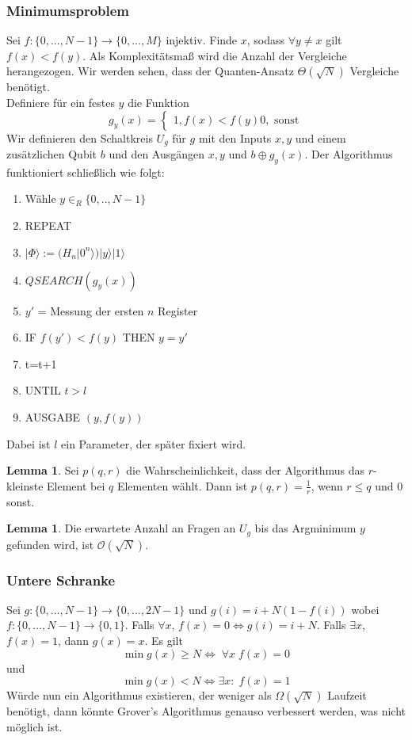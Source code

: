 \documentclass[a4paper, 12pt]{article}
\theoremstyle{plain}
\theoremstyle{definition}
\theoremstyle{lemma}
\newtheorem{lemma}[theorem]{Lemma}
\theoremstyle{remark}
\theoremstyle{example}
\begin{document}
	\subsubsection{Minimumsproblem}
	Sei $f:\{0,...,N-1\} \to \{0,...,M\}$ injektiv. Finde $x$, sodass $\forall y \neq x$ gilt $f(x) < f(y)$. Als Komplexitätsmaß wird die Anzahl der Vergleiche herangezogen. Wir werden sehen, dass der Quanten-Ansatz $\Theta(\sqrt{N})$ Vergleiche benötigt.\\
	Definiere für ein festes $y$ die Funktion \[g_y(x) = \begin{cases}
		1, f(x)<f(y)
		0, \text{ sonst}
	\end{cases}\]
	Wir definieren den Schaltkreis $U_g$ für $g$ mit den Inputs $x,y$ und einem zusätzlichen Qubit $b$ und den Ausgängen $x,y$ und $b\oplus g_y(x)$. Der Algorithmus funktioniert schließlich wie folgt: 
	\begin{enumerate}
		\item Wähle $y\in_R \{0,..,N-1\}$
		\item REPEAT
		\item $|\Phi\rangle := (H_n|0^n\rangle) |y\rangle|1\rangle$
		\item $QSEARCH(g_y(x))$
		\item $y'$ = Messung der ersten $n$ Register
		\item IF $f(y') < f(y)$ THEN $y=y'$
		\item t=t+1
		\item UNTIL $t>l$
		\item AUSGABE $(y,f(y))$
	\end{enumerate}
	Dabei ist $l$ ein Parameter, der später fixiert wird.
	\begin{lemma}
		Sei $p(q,r)$ die Wahrscheinlichkeit, dass der Algorithmus das $r$-kleinste Element bei $q$ Elementen wählt. Dann ist $p(q,r) = \frac{1}{r}$, wenn $r\leq q$ und $0$ sonst.
	\end{lemma}
	\begin{lemma}
		Die erwartete Anzahl an Fragen an $U_g$ bis das Argminimum $y$ gefunden wird, ist $\mathcal{O}(\sqrt{N})$. 
	\end{lemma}
	\subsubsection{Untere Schranke}
	Sei $g:\{0,...,N-1\} \to \{0,...,2N-1\}$ und $g(i) = i+N(1-f(i))$ wobei $f: \{0,...,N-1\} \to \{0,1\}$. Falls $\forall x$, $f(x) = 0 \Leftrightarrow g(i) = i+N$. Falls $\exists x$, $f(x) = 1$, dann $g(x) = x$. Es gilt \[\min g(x) \geq N \Leftrightarrow \; \forall x\; f(x) = 0\] und \[\min g(x) < N \Leftrightarrow \exists x:\; f(x) = 1\] Würde nun ein Algorithmus existieren, der weniger als $\Omega(\sqrt{N})$ Laufzeit benötigt, dann könnte Grover's Algorithmus genauso verbessert werden, was nicht möglich ist.
\end{document}
